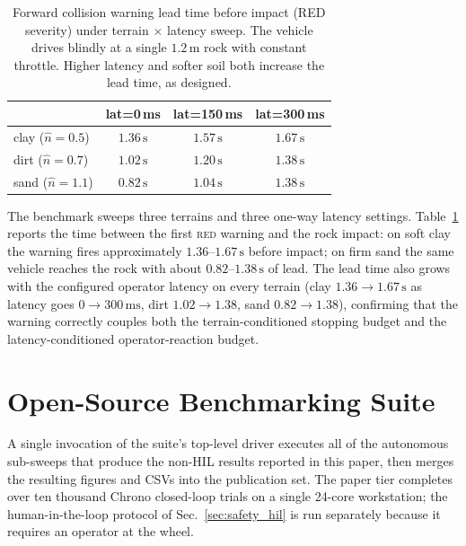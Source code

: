 \documentclass[conference,letterpaper,10pt]{IEEEtran}
\begin{document}
\begin{table}[!t]
  \renewcommand{\arraystretch}{1.10}
  \caption{Forward collision warning lead time before impact (RED
    severity) under terrain $\times$ latency sweep. The vehicle drives
    blindly at a single $1.2\,\mathrm{m}$ rock with constant throttle.
    Higher latency and softer soil both increase the lead time, as
    designed.}
  \label{tab:cw_lead}
  \centering
  \begin{tabular}{lccc}
    \toprule
     & \textbf{lat=0\,ms} & \textbf{lat=150\,ms} & \textbf{lat=300\,ms}\\
    \midrule
    clay ($\hat n\!=\!0.5$) & $1.36\,\mathrm{s}$ & $1.57\,\mathrm{s}$ & $1.67\,\mathrm{s}$\\
    dirt ($\hat n\!=\!0.7$) & $1.02\,\mathrm{s}$ & $1.20\,\mathrm{s}$ & $1.38\,\mathrm{s}$\\
    sand ($\hat n\!=\!1.1$) & $0.82\,\mathrm{s}$ & $1.04\,\mathrm{s}$ & $1.38\,\mathrm{s}$\\
    \bottomrule
  \end{tabular}
\end{table}

The benchmark
sweeps three terrains and three one-way latency settings.
Table~\ref{tab:cw_lead} reports the time between the first
\textsc{red} warning and the rock impact: on soft clay the warning
fires approximately $1.36\text{--}1.67\,\mathrm{s}$ before impact; on firm
sand the same vehicle reaches the rock with about $0.82\text{--}1.38\,\mathrm{s}$
of lead. The lead time also grows with the configured operator
latency on every terrain (clay $1.36\!\to\!1.67\,\mathrm{s}$ as
latency goes $0\!\to\!300\,\mathrm{ms}$, dirt $1.02\!\to\!1.38$, sand
$0.82\!\to\!1.38$), confirming that the warning correctly couples both
the terrain-conditioned stopping budget and the latency-conditioned
operator-reaction budget.

\section{Open-Source Benchmarking Suite}
\label{sec:suite}

A single invocation of the suite's top-level driver executes all of
the autonomous sub-sweeps that produce the non-HIL results reported
in this paper, then merges the resulting figures and CSVs into the
publication set. The paper tier completes
over ten thousand Chrono closed-loop trials on a single
24-core workstation; the human-in-the-loop protocol of
Sec.~\ref{sec:safety_hil} is run separately because it requires an
operator at the wheel.
\end{document}
